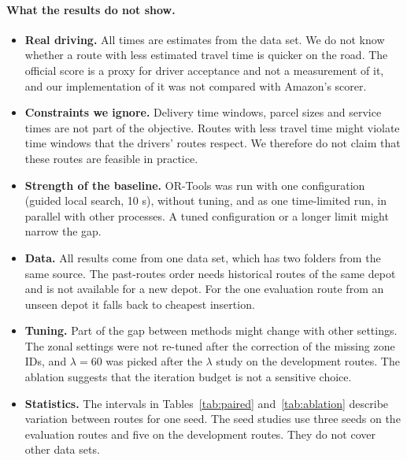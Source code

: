 \documentclass[11pt,a4paper]{article}
\begin{document}
\paragraph{What the results do not show.}
\begin{itemize}
\item \textbf{Real driving.} All times are estimates from the data set. We do not know whether a route with less estimated travel time is quicker on the road. The official score is a proxy for driver acceptance and not a measurement of it, and our implementation of it was not compared with Amazon's scorer.
\item \textbf{Constraints we ignore.} Delivery time windows, parcel sizes and service times are not part of the objective. Routes with less travel time might violate time windows that the drivers' routes respect. We therefore do not claim that these routes are feasible in practice.
\item \textbf{Strength of the baseline.} OR-Tools was run with one configuration (guided local search, 10 s), without tuning, and as one time-limited run, in parallel with other processes. A tuned configuration or a longer limit might narrow the gap.
\item \textbf{Data.} All results come from one data set, which has two folders from the same source. The past-routes order needs historical routes of the same depot and is not available for a new depot. For the one evaluation route from an unseen depot it falls back to cheapest insertion.
\item \textbf{Tuning.} Part of the gap between methods might change with other settings. The zonal settings were not re-tuned after the correction of the missing zone IDs, and $\lambda=60$ was picked after the $\lambda$ study on the development routes. The ablation suggests that the iteration budget is not a sensitive choice.
\item \textbf{Statistics.} The intervals in Tables~\ref{tab:paired} and~\ref{tab:ablation} describe variation between routes for one seed. The seed studies use three seeds on the evaluation routes and five on the development routes. They do not cover other data sets.
\end{itemize}
\end{document}
